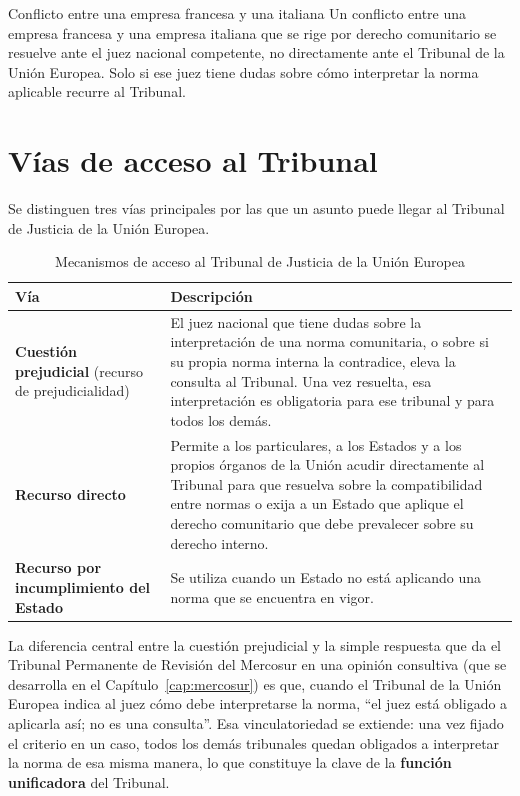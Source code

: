 \documentclass[12pt,oneside]{book}
\begin{document}
\begin{example}{Conflicto entre una empresa francesa y una italiana}
Un conflicto entre una empresa francesa y una empresa italiana que se rige por derecho comunitario se resuelve ante el juez nacional competente, no directamente ante el Tribunal de la Unión Europea. Solo si ese juez tiene dudas sobre cómo interpretar la norma aplicable recurre al Tribunal.
\end{example}

\section{Vías de acceso al Tribunal}

Se distinguen tres vías principales por las que un asunto puede llegar al Tribunal de Justicia de la Unión Europea.

\begin{table}[H]
\centering
\caption{Mecanismos de acceso al Tribunal de Justicia de la Unión Europea}
\renewcommand{\arraystretch}{1.25}
\begin{tabularx}{\textwidth}{
    >{\raggedright\arraybackslash}p{}
    >{\raggedright\arraybackslash}X
}
\toprule
\textbf{Vía} & \textbf{Descripción} \\
\midrule
\textbf{Cuestión prejudicial} (recurso de prejudicialidad) &
El juez nacional que tiene dudas sobre la interpretación de una norma comunitaria, o sobre si su propia norma interna la contradice, eleva la consulta al Tribunal. Una vez resuelta, esa interpretación es obligatoria para ese tribunal y para todos los demás. \\
\addlinespace
\textbf{Recurso directo} &
Permite a los particulares, a los Estados y a los propios órganos de la Unión acudir directamente al Tribunal para que resuelva sobre la compatibilidad entre normas o exija a un Estado que aplique el derecho comunitario que debe prevalecer sobre su derecho interno. \\
\addlinespace
\textbf{Recurso por incumplimiento del Estado} &
Se utiliza cuando un Estado no está aplicando una norma que se encuentra en vigor. \\
\bottomrule
\end{tabularx}
\end{table}

La diferencia central entre la cuestión prejudicial y la simple respuesta que da el Tribunal Permanente de Revisión del Mercosur en una opinión consultiva (que se desarrolla en el Capítulo~\ref{cap:mercosur}) es que, cuando el Tribunal de la Unión Europea indica al juez cómo debe interpretarse la norma, “el juez está obligado a aplicarla así; no es una consulta”. Esa vinculatoriedad se extiende: una vez fijado el criterio en un caso, todos los demás tribunales quedan obligados a interpretar la norma de esa misma manera, lo que constituye la clave de la \textbf{función unificadora} del Tribunal.
\end{document}

